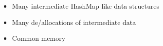         \begin{itemize}
            \item Many intermediate HashMap like data structures
            \item Many de/allocations of intermediate data
            \item Common memory
        \end{itemize}